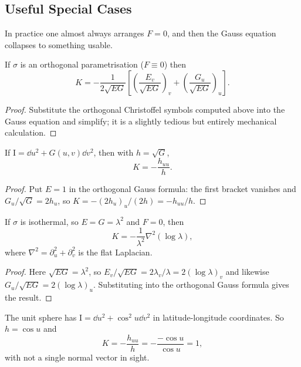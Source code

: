 \subsection{Useful Special Cases}

In practice one almost always arranges $F = 0$, and then the Gauss equation collapses to something usable.

\begin{corollary}
    If $\sigma$ is an orthogonal parametrisation ($F \equiv 0$) then
    $$
    K = -\frac{1}{2\sqrt{EG}}\left[\left(\frac{E_v}{\sqrt{EG}}\right)_v + \left(\frac{G_u}{\sqrt{EG}}\right)_u\right].
    $$
\end{corollary}
\begin{proof}
    Substitute the orthogonal Christoffel symbols computed above into the Gauss equation and simplify; it is a slightly tedious but entirely mechanical calculation.
\end{proof}

\begin{corollary}
    If $\mathrm{I} = \dd u^2 + G(u,v)\dd v^2$, then with $h = \sqrt{G}$,
    $$
    K = -\frac{h_{uu}}{h}.
    $$
\end{corollary}
\begin{proof}
    Put $E = 1$ in the orthogonal Gauss formula: the first bracket vanishes and $G_u/\sqrt{G} = 2h_u$, so $K = -(2h_u)_u/(2h) = -h_{uu}/h$.
\end{proof}

\begin{corollary}
    If $\sigma$ is isothermal, so $E = G = \lambda^2$ and $F = 0$, then
    $$
    K = -\frac{1}{\lambda^2}\nabla^2\left(\log\lambda\right),
    $$
    where $\nabla^2 = \partial_u^2 + \partial_v^2$ is the flat Laplacian.
\end{corollary}
\begin{proof}
    Here $\sqrt{EG} = \lambda^2$, so $E_v/\sqrt{EG} = 2\lambda_v/\lambda = 2(\log\lambda)_v$ and likewise $G_u/\sqrt{EG} = 2(\log\lambda)_u$. Substituting into the orthogonal Gauss formula gives the result.
\end{proof}

\begin{example}
    The unit sphere has $\mathrm{I} = \dd u^2 + \cos^2 u \dd v^2$ in latitude-longitude coordinates. So $h = \cos u$ and
    $$
    K = -\frac{h_{uu}}{h} = -\frac{-\cos u}{\cos u} = 1,
    $$
    with not a single normal vector in sight.
\end{example}

